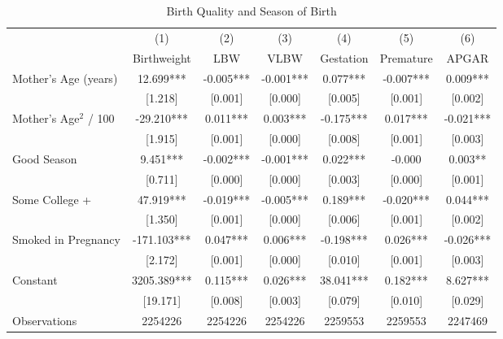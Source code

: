 \documentclass[a4paper, 11.5 pt]{article}
\theoremstyle{plain}
\begin{document}
\begin{doublespace}
\begin{table}[htbp]\centering
\def\sym#1{\ifmmode^{#1}\else\(^{#1}\)\fi}
\caption{Birth Quality and Season of Birth  \label{tab:qualityMain}}
\begin{tabular}{l*{6}{c}}
\toprule
                    &\multicolumn{1}{c}{(1)}   &\multicolumn{1}{c}{(2)}   &\multicolumn{1}{c}{(3)}   &\multicolumn{1}{c}{(4)}   &\multicolumn{1}{c}{(5)}   &\multicolumn{1}{c}{(6)}   \\
                    & Birthweight   &         LBW   &        VLBW   &   Gestation   &   Premature   &       APGAR   \\
\midrule
Mother's Age (years)&      12.699***&      -0.005***&      -0.001***&       0.077***&      -0.007***&       0.009***\\
                    &     [1.218]   &     [0.001]   &     [0.000]   &     [0.005]   &     [0.001]   &     [0.002]   \\
Mother's Age$^2$ / 100&     -29.210***&       0.011***&       0.003***&      -0.175***&       0.017***&      -0.021***\\
                    &     [1.915]   &     [0.001]   &     [0.000]   &     [0.008]   &     [0.001]   &     [0.003]   \\
Good Season         &       9.451***&      -0.002***&      -0.001***&       0.022***&      -0.000   &       0.003** \\
                    &     [0.711]   &     [0.000]   &     [0.000]   &     [0.003]   &     [0.000]   &     [0.001]   \\
Some College +      &      47.919***&      -0.019***&      -0.005***&       0.189***&      -0.020***&       0.044***\\
                    &     [1.350]   &     [0.001]   &     [0.000]   &     [0.006]   &     [0.001]   &     [0.002]   \\
Smoked in Pregnancy &    -171.103***&       0.047***&       0.006***&      -0.198***&       0.026***&      -0.026***\\
                    &     [2.172]   &     [0.001]   &     [0.000]   &     [0.010]   &     [0.001]   &     [0.003]   \\
Constant            &    3205.389***&       0.115***&       0.026***&      38.041***&       0.182***&       8.627***\\
                    &    [19.171]   &     [0.008]   &     [0.003]   &     [0.079]   &     [0.010]   &     [0.029]   \\
\midrule
Observations        &     2254226   &     2254226   &     2254226   &     2259553   &     2259553   &     2247469   \\

\end{tabular}
\end{table}
\end{doublespace}
\end{document}
